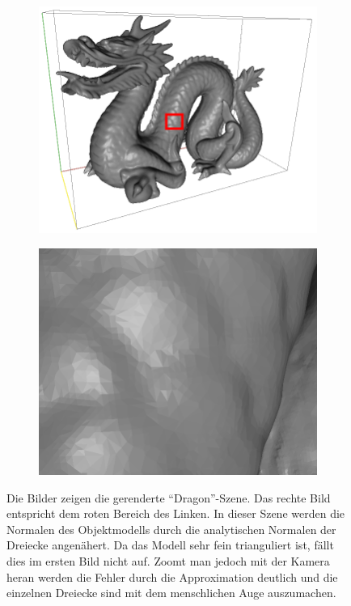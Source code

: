 		\begin{figure}
			\begin{subfigure}[b]{0.5\textwidth}
				\center
				\includegraphics[scale=0.2]{pic/normal_facette-mark.png}
				\caption{}
			\end{subfigure}
			\begin{subfigure}[b]{0.5\textwidth}
				\center
				\includegraphics[scale=0.2]{pic/normal_facette-zoom.png}
				\caption{}
			\end{subfigure}
			\caption{Die Bilder zeigen die gerenderte \enquote{Dragon}-Szene. Das rechte Bild entspricht dem roten Bereich des Linken. In dieser Szene werden die Normalen des Objektmodells durch die analytischen Normalen der Dreiecke angenähert. Da das Modell sehr fein trianguliert ist, fällt dies im ersten Bild nicht auf. Zoomt man jedoch mit der Kamera heran werden die Fehler durch die Approximation deutlich und die einzelnen Dreiecke sind mit dem menschlichen Auge auszumachen.}
			\label{fig:facette}
		\end{figure}


